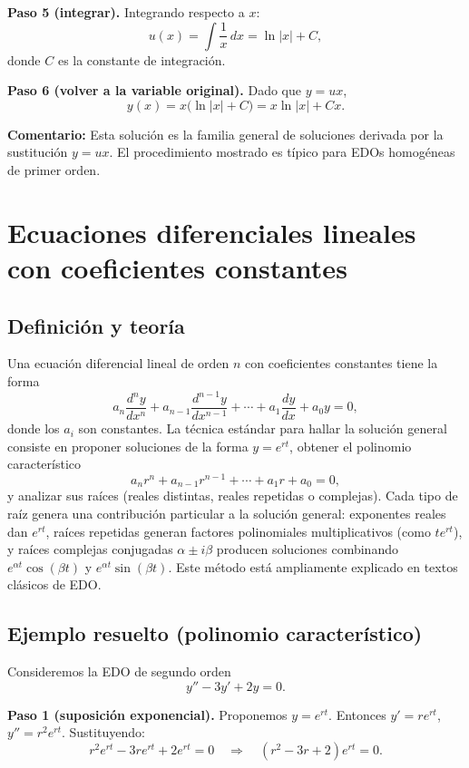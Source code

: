 \documentclass[stu]{apa7} %
\begin{document}
\textbf{Paso 5 (integrar).} Integrando respecto a \(x\):
\[
u(x) = \int \frac{1}{x}\,dx = \ln|x| + C,
\]
donde \(C\) es la constante de integración.

\textbf{Paso 6 (volver a la variable original).} Dado que
\(y = u x\),
\[
y(x) = x\bigl(\ln|x| + C\bigr) = x\ln|x| + Cx.
\]

\textbf{Comentario:} Esta solución es la familia general de soluciones
derivada por la sustitución \(y=ux\). El procedimiento mostrado es
típico para EDOs homogéneas de primer orden. \parencite{kreyszig2011, boyce2017}

\section{Ecuaciones diferenciales lineales con coeficientes constantes}
\subsection{Definición y teoría}
Una ecuación diferencial lineal de orden \(n\) con coeficientes
constantes tiene la forma
\[
a_n \frac{d^n y}{dx^n} + a_{n-1}\frac{d^{n-1}y}{dx^{n-1}} + \cdots + a_1 \frac{dy}{dx} + a_0 y = 0,
\]
donde los \(a_i\) son constantes. La técnica estándar para hallar la
solución general consiste en proponer soluciones de la forma
\(y=e^{rt}\), obtener el polinomio característico
\[
a_n r^n + a_{n-1} r^{n-1} + \cdots + a_1 r + a_0 = 0,
\]
y analizar sus raíces (reales distintas, reales repetidas o complejas).
Cada tipo de raíz genera una contribución particular a la solución
general: exponentes reales dan \(e^{rt}\), raíces repetidas generan
factores polinomiales multiplicativos (como \(t e^{rt}\)), y raíces
complejas conjugadas \(\alpha\pm i\beta\) producen soluciones
combinando \(e^{\alpha t}\cos(\beta t)\) y \(e^{\alpha t}\sin(\beta t)\).
Este método está ampliamente explicado en textos clásicos de EDO. \parencite{boyce2017, kreyszig2011, apa7cls}

\subsection{Ejemplo resuelto (polinomio característico)}
Consideremos la EDO de segundo orden
\begin{equation}\label{eq:const-coef}
y'' - 3y' + 2y = 0.
\end{equation}

\textbf{Paso 1 (suposición exponencial).} Proponemos
\(y=e^{rt}\). Entonces \(y'=re^{rt}\), \(y''=r^2 e^{rt}\). Sustituyendo:
\[
r^2 e^{rt} - 3r e^{rt} + 2 e^{rt} = 0 \quad\Longrightarrow\quad (r^2 -3r +2)e^{rt}=0.
\]
\end{document}
